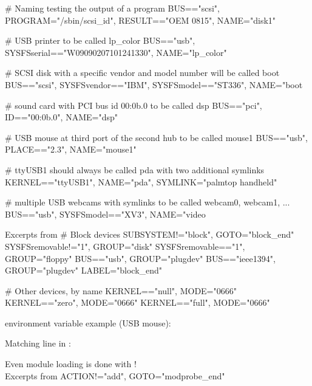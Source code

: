 \starttyping
# Naming testing the output of a program
BUS=="scsi", PROGRAM="/sbin/scsi_id", RESULT=="OEM 0815", NAME="disk1"

# USB printer to be called lp_color
BUS=="usb", SYSFS{serial}=="W09090207101241330", NAME="lp_color"

# SCSI disk with a specific vendor and model number will be called boot
BUS=="scsi", SYSFS{vendor}=="IBM", SYSFS{model}=="ST336", NAME="boot%

# sound card with PCI bus id 00:0b.0 to be called dsp
BUS=="pci", ID=="00:0b.0", NAME="dsp"

# USB mouse at third port of the second hub to be called mouse1
BUS=="usb", PLACE=="2.3", NAME="mouse1"

# ttyUSB1 should always be called pda with two additional symlinks
KERNEL=="ttyUSB1", NAME="pda", SYMLINK="palmtop handheld"

# multiple USB webcams with symlinks to be called webcam0, webcam1, ...
BUS=="usb", SYSFS{model}=="XV3", NAME="video%
\stoptyping

  Excerpts from 
\starttyping
# Block devices
SUBSYSTEM!="block", GOTO="block_end"
SYSFS{removable}!="1", GROUP="disk"
SYSFS{removable}=="1", GROUP="floppy"
BUS=="usb", GROUP="plugdev"
BUS=="ieee1394", GROUP="plugdev"
LABEL="block_end"

# Other devices, by name
KERNEL=="null", MODE="0666"
KERNEL=="zero", MODE="0666"
KERNEL=="full", MODE="0666"
\stoptyping


  \startitemize
  \item {} environment variable example (USB mouse):\\
  \item Matching line in :\\
  \stopitemize

  Even module loading is done with !\\
  Excerpts from 
\starttyping
ACTION!="add", GOTO="modprobe_end"

